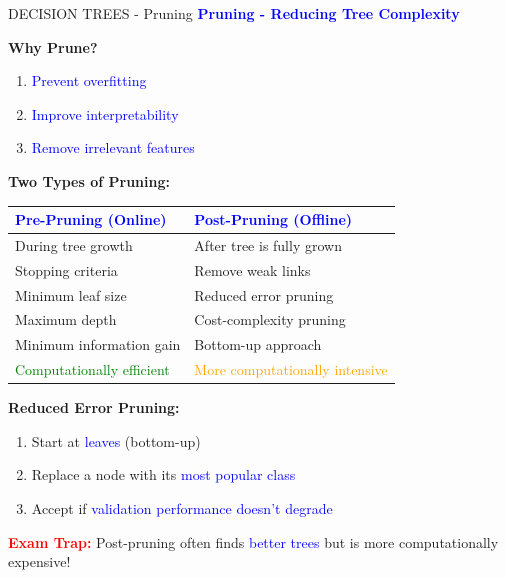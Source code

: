\documentclass[8pt]{beamer}
\begin{document}
	\begin{frame}{DECISION TREES - Pruning}
		\fontsize{6.5}{7.5}\selectfont
		\textcolor{blue}{\textbf{Pruning - Reducing Tree Complexity}}
		
		\textbf{Why Prune?}
		\begin{enumerate}
			\item \textcolor{blue}{Prevent overfitting}
			\item \textcolor{blue}{Improve interpretability}
			\item \textcolor{blue}{Remove irrelevant features}
		\end{enumerate}
		
		\textbf{Two Types of Pruning:}
		
		\begin{tabular}{|p{4cm}|p{4cm}|}
			\hline
			\textcolor{blue}{Pre-Pruning (Online)} & \textcolor{blue}{Post-Pruning (Offline)} \\
			\hline
			During tree growth & After tree is fully grown \\
			\hline
			Stopping criteria & Remove weak links \\
			\hline
			Minimum leaf size & Reduced error pruning \\
			\hline
			Maximum depth & Cost-complexity pruning \\
			\hline
			Minimum information gain & Bottom-up approach \\
			\hline
			\textcolor{green}{Computationally efficient} & \textcolor{orange}{More computationally intensive} \\
			\hline
		\end{tabular}
		
		\textbf{Reduced Error Pruning:}
		\begin{enumerate}
			\item Start at \textcolor{blue}{leaves} (bottom-up)
			\item Replace a node with its \textcolor{blue}{most popular class}
			\item Accept if \textcolor{blue}{validation performance doesn't degrade}
		\end{enumerate}
		
		\textcolor{red}{\textbf{Exam Trap:}} Post-pruning often finds \textcolor{blue}{better trees} but is more computationally expensive!
	\end{frame}
	
\end{document}
